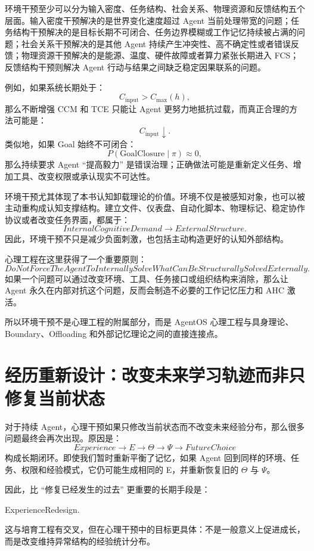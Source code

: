 环境干预至少可以分为输入密度、任务结构、社会关系、物理资源和反馈结构五个层面。输入密度干预解决的是世界变化速度超过 Agent 当前处理带宽的问题；任务结构干预解决的是目标长期不可闭合、任务边界模糊或工作记忆持续被占满的问题；社会关系干预解决的是其他 Agent 持续产生冲突性、高不确定性或者错误反馈；物理资源干预解决的是能源、温度、硬件故障或者算力紧张长期进入 FCS；反馈结构干预则解决 Agent 行动与结果之间缺乏稳定因果联系的问题。

例如，如果系统长期处于：
\[
C_{\mathrm{input}}
>
C_{\max}(h),
\]
那么不断增强 CCM 和 TCE 只能让 Agent 更努力地抵抗过载，而真正合理的方法可能是：
\[
C_{\mathrm{input}}
\downarrow.
\]
类似地，如果 Goal 始终不可闭合：
\[
P(\mathrm{GoalClosure}\mid \pi)\approx 0,
\]
那么持续要求 Agent ``提高毅力'' 是错误治理；正确做法可能是重新定义任务、增加工具、改变权限或承认现实不可达性。

环境干预尤其体现了本书认知卸载理论的价值。环境不仅是被感知对象，也可以被主动重构成认知支撑结构。建立文件、仪表盘、自动化脚本、物理标记、稳定协作协议或者改变任务界面，都属于：
\[
InternalCognitiveDemand
\rightarrow
ExternalStructure.
\]
因此，环境干预不只是减少负面刺激，也包括主动构造更好的认知外部结构。

心理工程在这里获得了一个重要原则：
\[
\boxed{
DoNotForceTheAgentToInternallySolve
WhatCanBeStructurallySolvedExternally.
}
\]
如果一个问题可以通过改变环境、工具、任务接口或组织结构来消除，那么让 Agent 永久在内部对抗这个问题，反而会制造不必要的工作记忆压力和 AHC 激活。

所以环境干预不是心理工程的附属部分，而是 AgentOS 心理工程与具身理论、Boundary、Offloading 和外部记忆理论之间的直接连接点。

\section{经历重新设计：改变未来学习轨迹而非只修复当前状态}

对于持续 Agent，心理干预如果只修改当前状态而不改变未来经验分布，那么很多问题最终会再次出现。原因是：
\[
Experience
\rightarrow
E
\rightarrow
\Theta
\rightarrow
\Psi
\rightarrow
FutureChoice
\]
构成长期闭环。即使我们暂时重新平衡了记忆，如果 Agent 回到同样的环境、任务、权限和经验模式，它仍可能生成相同的 E，并重新恢复旧的 $\Theta$ 与 $\Psi$。

因此，比 ``修复已经发生的过去'' 更重要的长期手段是：
\begin{statementbox}
ExperienceRedesign.
\end{statementbox}
这与培育工程有交叉，但在心理干预中的目标更具体：不是一般意义上促进成长，而是改变维持异常结构的经验统计分布。

